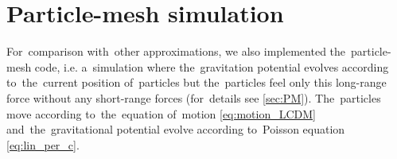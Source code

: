 
\section{Particle-mesh simulation}
For~comparison with~other approximations, we also implemented the~particle-mesh code, i.e. a~simulation where the~gravitation potential evolves according to~the~current position of~particles but the~particles feel only this long-range force without any short-range forces (for~details see \autoref{sec:PM}). The~particles move according to~the~equation of~motion \eqref{eq:motion_LCDM} and~the~gravitational potential evolve according to~Poisson equation \eqref{eq:lin_per_c}.

